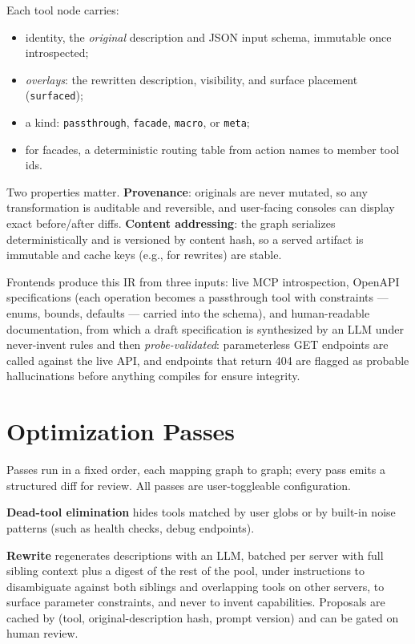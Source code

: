 \documentclass[11pt]{article}
\begin{document}
Each tool node carries:

\begin{itemize}
\item identity, the \emph{original} description and
JSON input schema, immutable once introspected;
\item \emph{overlays}: the rewritten description, visibility, and surface placement (\texttt{surfaced});
\item a kind: \texttt{passthrough}, \texttt{facade}, \texttt{macro}, or
\texttt{meta};
\item for facades, a deterministic routing table from action names to member
tool ids.
\end{itemize}

Two properties matter. \textbf{Provenance}: originals are never mutated, so
any transformation is auditable and reversible, and user-facing consoles can
display exact before/after diffs. \textbf{Content addressing}: the graph
serializes deterministically and is versioned by content hash, so a served
artifact is immutable and cache keys (e.g., for rewrites) are stable.

Frontends produce this IR from three inputs: live MCP introspection, OpenAPI
specifications (each operation becomes a passthrough tool with constraints
--- enums, bounds, defaults --- carried into the schema), and human-readable
documentation, from which a draft specification is synthesized by an LLM
under never-invent rules and then \emph{probe-validated}: parameterless GET
endpoints are called against the live API, and endpoints that return 404 are
flagged as probable hallucinations before anything compiles for ensure integrity.

\section{Optimization Passes}\label{sec:passes}

Passes run in a fixed order, each mapping graph to graph; every pass emits a
structured diff for review. All passes are user-toggleable configuration.

\textbf{Dead-tool elimination} hides tools matched by user globs or by
built-in noise patterns (such as health checks, debug endpoints).

\textbf{Rewrite} regenerates descriptions with an LLM, batched per server
with full sibling context plus a digest of the rest of the pool, under
instructions to disambiguate against both siblings and overlapping tools on
other servers, to surface parameter constraints, and never to invent
capabilities. Proposals are cached by (tool, original-description hash,
prompt version) and can be gated on human review.
\end{document}
